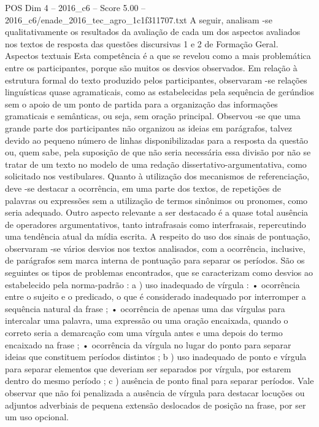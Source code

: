\begin{textsample}{POS Dim 4 – 2016\_c6 – Score 5.00 – 2016\_c6/enade\_2016\_tec\_agro\_1c1f311707.txt}
A seguir, analisam -se qualitativamente os resultados da avaliação de cada um dos aspectos avaliados nos textos de resposta das questões discursivas 1 e 2 de Formação Geral.
Aspectos textuais Esta competência é a que se revelou como a mais problemática entre os participantes, porque são muitos os desvios observados.
Em relação à estrutura formal do texto produzido pelos participantes, observaram -se relações linguísticas quase agramaticais, como as estabelecidas pela sequência de gerúndios sem o apoio de um ponto de partida para a organização das informações gramaticais e semânticas, ou seja, sem oração principal.
Observou -se que uma grande parte dos participantes não organizou as ideias em parágrafos, talvez devido ao pequeno número de linhas disponibilizadas para a resposta da questão ou, quem sabe, pela suposição de que não seria necessária essa divisão por não se tratar de um texto no modelo de uma redação dissertativo-argumentativa, como solicitado nos vestibulares.
Quanto à utilização dos mecanismos de referenciação, deve -se destacar a ocorrência, em uma parte dos textos, de repetições de palavras ou expressões sem a utilização de termos sinônimos ou pronomes, como seria adequado.
Outro aspecto relevante a ser destacado é a quase total ausência de operadores argumentativos, tanto intrafrasais como interfrasais, repercutindo uma tendência atual da mídia escrita.
A respeito do uso dos sinais de pontuação, observaram -se vários desvios nos textos analisados, com a ocorrência, inclusive, de parágrafos sem marca interna de pontuação para separar os períodos.
São os seguintes os tipos de problemas encontrados, que se caracterizam como desvios ao estabelecido pela norma-padrão : a ) uso inadequado de vírgula : • ocorrência entre o sujeito e o predicado, o que é considerado inadequado por interromper a sequência natural da frase ; • ocorrência de apenas uma das vírgulas para intercalar uma palavra, uma expressão ou uma oração encaixada, quando o correto seria a demarcação com uma vírgula antes e uma depois do termo encaixado na frase ; • ocorrência da vírgula no lugar do ponto para separar ideias que constituem períodos distintos ; b ) uso inadequado de ponto e vírgula para separar elementos que deveriam ser separados por vírgula, por estarem dentro do mesmo período ; c ) ausência de ponto final para separar períodos.
Vale observar que não foi penalizada a ausência de vírgula para destacar locuções ou adjuntos adverbiais de pequena extensão deslocados de posição na frase, por ser um uso opcional.

\end{textsample}
